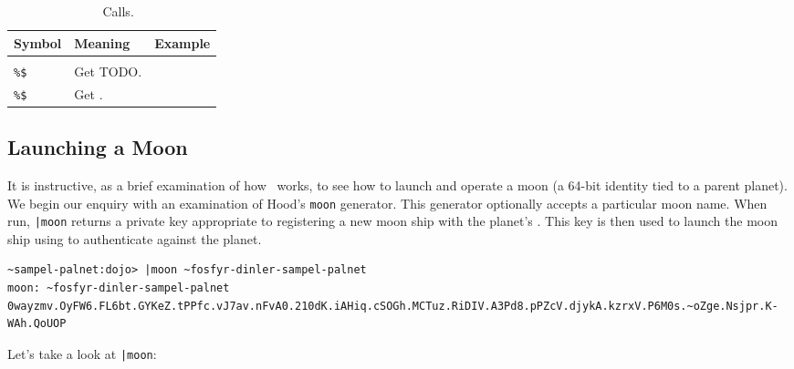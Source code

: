 
\begin{table}[h!]
  \begin{center}
    \caption{\jael~\dotket~Calls.}
    \label{ha:jael}
    \begin{tabular}{lll}
      Symbol & Meaning & Example \\
      \hline \\
      \texttt{\%\$} & Get TODO. & \\
      \texttt{\%\$} & Get . & \\
    \end{tabular}
  \end{center}
\end{table}


\subsection{Launching a Moon}

It is instructive, as a brief examination of how \jael~works, to see how to launch and operate a moon (a 64-bit identity tied to a parent planet).  We begin our enquiry with an examination of Hood's \texttt{moon} generator.  This generator optionally accepts a particular moon name.  When run, \texttt{|moon} returns a private key appropriate to registering a new moon ship with the planet's \jael.  This key is then used to launch the moon ship using \jael to authenticate against the planet.

\begin{lstlisting}
~sampel-palnet:dojo> |moon ~fosfyr-dinler-sampel-palnet
moon: ~fosfyr-dinler-sampel-palnet
0wayzmv.OyFW6.FL6bt.GYKeZ.tPPfc.vJ7av.nFvA0.210dK.iAHiq.cSOGh.MCTuz.RiDIV.A3Pd8.pPZcV.djykA.kzrxV.P6M0s.~oZge.Nsjpr.K-WAh.QoUOP
\end{lstlisting}

Let's take a look at \texttt{|moon}:

